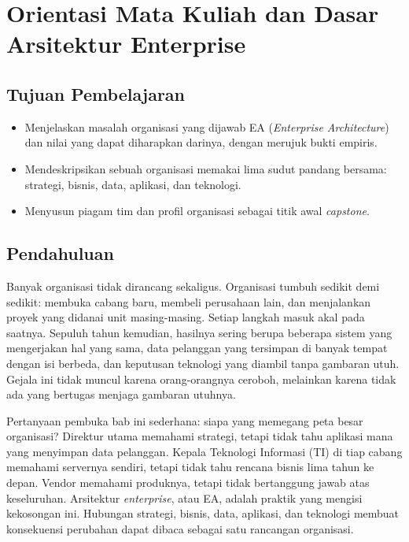 \chapter{Orientasi Mata Kuliah dan Dasar Arsitektur Enterprise}
\label{ch:ch01-orientasi}

\section*{Tujuan Pembelajaran}
\begin{itemize}
  \item Menjelaskan masalah organisasi yang dijawab EA (\textit{Enterprise Architecture}) dan nilai yang dapat diharapkan darinya, dengan merujuk bukti empiris.
  \item Mendeskripsikan sebuah organisasi memakai lima sudut pandang bersama: strategi, bisnis, data, aplikasi, dan teknologi.
  \item Menyusun piagam tim dan profil organisasi sebagai titik awal \textit{capstone}.
\end{itemize}

\section{Pendahuluan}

Banyak organisasi tidak dirancang sekaligus. Organisasi tumbuh sedikit demi
sedikit: membuka cabang baru, membeli perusahaan lain, dan menjalankan proyek
yang didanai unit masing-masing. Setiap langkah masuk akal pada saatnya.
Sepuluh tahun kemudian, hasilnya sering berupa beberapa sistem yang
mengerjakan hal yang sama, data pelanggan yang tersimpan di banyak tempat
dengan isi berbeda, dan keputusan teknologi yang diambil tanpa gambaran utuh.
Gejala ini tidak muncul karena orang-orangnya ceroboh, melainkan karena tidak
ada yang bertugas menjaga gambaran utuhnya.

Pertanyaan pembuka bab ini sederhana: siapa yang memegang peta besar
organisasi? Direktur utama memahami strategi, tetapi tidak tahu aplikasi mana
yang menyimpan data pelanggan. Kepala Teknologi Informasi (TI) di tiap cabang
memahami servernya sendiri, tetapi tidak tahu rencana bisnis lima tahun ke
depan. Vendor memahami produknya, tetapi tidak bertanggung jawab atas
keseluruhan. Arsitektur \textit{enterprise}, atau EA, adalah praktik yang
mengisi kekosongan ini. Hubungan strategi, bisnis, data, aplikasi, dan teknologi membuat
konsekuensi perubahan dapat dibaca sebagai satu rancangan organisasi.

